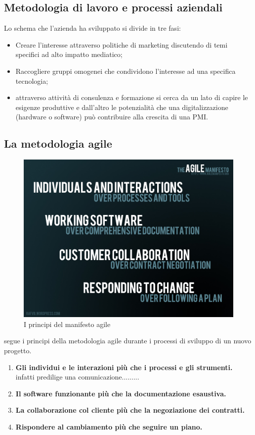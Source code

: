 \subsection{Metodologia di lavoro e processi aziendali}
Lo schema che l'azienda ha sviluppato si divide in tre fasi:
\begin{itemize}
\item Creare l’interesse attraverso politiche di marketing discutendo di temi specifici ad alto impatto mediatico;
\item Raccogliere gruppi omogenei che condividono l'interesse ad una specifica tecnologia;
\item attraverso attività di consulenza e formazione si cerca da un lato di capire le esigenze produttive e dall’altro le potenzialità che una digitalizzazione (hardware o software) può contribuire alla crescita di una PMI.
\end{itemize}

\subsection{La metodologia agile}
\begin{figure}[H]
	\begin{center}
	\includegraphics[scale=0.25]{immagini/agile_manifesto.jpg}
	\caption{I principi del manifesto agile}
	\end{center}
\end{figure}
\lab{} segue i principi della metodologia agile durante i processi di sviluppo di un nuovo progetto.
\begin{enumerate}
\item \textbf{Gli individui e le interazioni più che i processi e gli strumenti.}
\tab \lab{} infatti predilige una comunicazione.........
\item \textbf{Il software funzionante più che la documentazione esaustiva.}
\item \textbf{La collaborazione col cliente più che la negoziazione dei contratti.}
\item \textbf{Rispondere al cambiamento più che seguire un piano.}
\end{enumerate}




